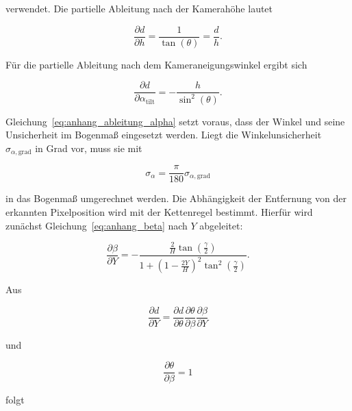 verwendet. Die partielle Ableitung nach der Kamerahöhe lautet 

\begin{equation} 
    \frac{\partial d}{\partial h} = \frac{1}{\tan(\theta)} = \frac{d}{h}. 
    \label{eq:anhang_ableitung_h} 
\end{equation} 

Für die partielle Ableitung nach dem Kameraneigungswinkel ergibt sich 

\begin{equation} 
    \frac{\partial d} {\partial \alpha_{\mathrm{tilt}}} = -\frac{h}{\sin^2(\theta)}. 
    \label{eq:anhang_ableitung_alpha} 
\end{equation} 

Gleichung~\ref{eq:anhang_ableitung_alpha} setzt voraus, dass der Winkel und seine Unsicherheit im Bogenmaß eingesetzt werden. Liegt die Winkelunsicherheit \(\sigma_{\alpha,\mathrm{grad}}\) in Grad vor, muss sie mit 

\begin{equation} 
    \sigma_{\alpha} = \frac{\pi}{180} \sigma_{\alpha,\mathrm{grad}} 
    \label{eq:anhang_grad_bogenmass} 
\end{equation} 

in das Bogenmaß umgerechnet werden. Die Abhängigkeit der Entfernung von der erkannten Pixelposition wird mit der Kettenregel bestimmt. Hierfür wird zunächst Gleichung~\ref{eq:anhang_beta} nach \(Y\) abgeleitet: 

\begin{equation} 
    \frac{\partial \beta}{\partial Y} = -\frac{ \frac{2}{H}\tan\left(\frac{\gamma}{2}\right) }{ 1+ \left(1-\frac{2Y}{H}\right)^2 \tan^2\left(\frac{\gamma}{2}\right) }. 
    \label{eq:anhang_ableitung_beta_y} 
\end{equation} 

Aus 

\begin{equation} 
    \frac{\partial d}{\partial Y} = \frac{\partial d}{\partial \theta} \frac{\partial \theta}{\partial \beta} \frac{\partial \beta}{\partial Y} 
    \label{eq:anhang_kettenregel} 
\end{equation} 

und 

\begin{equation} 
    \frac{\partial \theta}{\partial \beta} = 1 
    \label{eq:anhang_ableitung_theta_beta} 
\end{equation} 

folgt 

